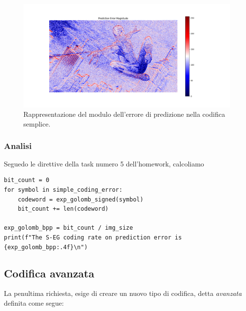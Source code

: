\begin{figure}[h]
    \centering
    \includegraphics[width = .9\textwidth]{hw-1/report/imgs/simple-coding.png}
    \caption{Rappresentazione del modulo dell'errore di predizione nella codifica semplice.}
    \label{fig:simple-coding}
\end{figure}







\subsubsection{Analisi} 
Seguedo le direttive della task numero 5 dell'homework, calcoliamo 

\begin{lstlisting}
bit_count = 0
for symbol in simple_coding_error:
    codeword = exp_golomb_signed(symbol)
    bit_count += len(codeword)

exp_golomb_bpp = bit_count / img_size
print(f"The S-EG coding rate on prediction error is {exp_golomb_bpp:.4f}\n")    
\end{lstlisting}



\vspace{15px}\subsection{Codifica avanzata}

La penultima richiesta, esige di creare un nuovo tipo di codifica, detta \textsl{avanzata} definita come segue:

